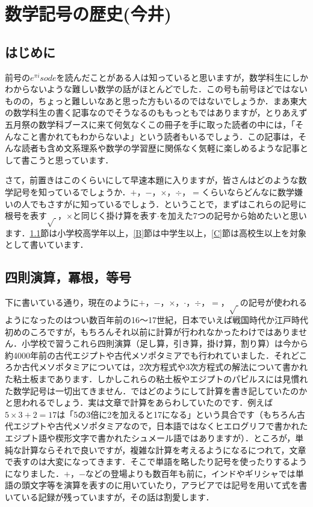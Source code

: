 \documentclass[8pt,a4j]{jreport}
\begin{document}
\chapter{数学記号の歴史(今井)}

\section*{はじめに}
前号の$e^{\pi i}sode$を読んだことがある人は知っていると思いますが，数学科生にしかわからないような難しい数学の話がほとんどでした．この号も前号ほどではないものの，ちょっと難しいなあと思った方もいるのではないでしょうか．まあ東大の数学科生の書く記事なのでそうなるのももっともではありますが，とりあえず五月祭の数学科ブースに来て何気なくこの冊子を手に取った読者の中には，「そんなこと書かれてもわからないよ」という読者もいるでしょう．この記事は，そんな読者も含め文系理系や数学の学習歴に関係なく気軽に楽しめるような記事として書こうと思っています．

さて，前置きはこのくらいにして早速本題に入りますが，皆さんはどのような数学記号を知っているでしょうか．$+$，$-$，$\times$，$\div$，$=$くらいならどんなに数学嫌いの人でもさすがに知っているでしょう．ということで，まずはこれらの記号に根号を表す$\sqrt{\ }$，$\times$と同じく掛け算を表す$\cdot$を加えた7つの記号から始めたいと思います．\ref{A}節は小学校高学年以上，\ref{B}節は中学生以上，\ref{C}節は高校生以上を対象として書いています．

\section{四則演算，冪根，等号}\label{A}
下に書いている通り，現在のように$+$，$-$，$\times$，$\cdot$，$\div$，$=$，$\sqrt{\ }$の記号が使われるようになったのはつい数百年前の16～17世紀，日本でいえば戦国時代か江戸時代初めのころですが，もちろんそれ以前に計算が行われなかったわけではありません．小学校で習うこれら四則演算（足し算，引き算，掛け算，割り算）は今から約4000年前の古代エジプトや古代メソポタミアでも行われていました．それどころか古代メソポタミアについては，2次方程式や3次方程式の解法について書かれた粘土板まであります．しかしこれらの粘土板やエジプトのパピルスには見慣れた数学記号は一切出てきません．ではどのようにして計算を書き記していたのかと思われるでしょう．実は文章で計算をあらわしていたのです．例えば$5\times 3+2=17$は「5の3倍に2を加えると17になる」という具合です（もちろん古代エジプトや古代メソポタミアなので，日本語ではなくヒエログリフで書かれたエジプト語や楔形文字で書かれたシュメール語ではありますが）．ところが，単純な計算ならそれで良いですが，複雑な計算を考えるようになるにつれて，文章で表すのは大変になってきます．そこで単語を略したり記号を使ったりするようになりました．$+$，$-$などの登場よりも数百年も前に，インドやギリシャでは単語の頭文字等を演算を表すのに用いていたり，アラビアでは記号を用いて式を書いている記録が残っていますが，その話は割愛します．
\end{document}
